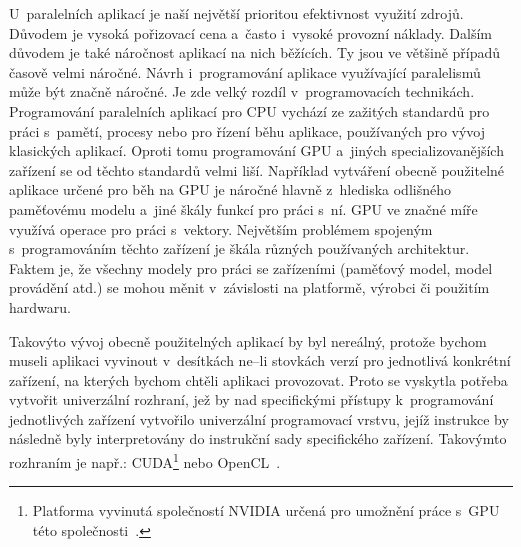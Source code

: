  U~paralelních aplikací je naší největší prioritou efektivnost využití zdrojů. Důvodem je
vysoká pořizovací cena a~často i~vysoké provozní náklady. Dalším důvodem je také náročnost aplikací
na nich běžících. Ty jsou ve většině případů časově velmi náročné. Návrh i~programování aplikace
využívající paralelismů může být značně náročné. Je zde velký rozdíl v~programovacích technikách.
Programování paralelních aplikací pro CPU vychází ze zažitých standardů pro práci s~pamětí,
procesy nebo pro řízení běhu aplikace, používaných pro vývoj klasických aplikací. Oproti tomu
programování GPU a~jiných specializovanějších zařízení se od těchto standardů velmi liší.
Například vytváření obecně použitelné aplikace určené pro běh na GPU je náročné hlavně z~hlediska
odlišného paměťovému modelu a~jiné škály funkcí pro práci s~ní. GPU ve značné míře využívá
operace pro práci s~vektory. Největším problémem spojeným s~programováním těchto zařízení je škála
různých používaných architektur. Faktem je, že všechny modely pro práci se zařízeními (paměťový
model, model provádění atd.) se mohou měnit v~závislosti na platformě, výrobci či použitím
hardwaru.

 Takovýto vývoj obecně použitelných aplikací by byl nereálný, protože bychom museli
aplikaci vyvinout v~desítkách ne--li stovkách verzí pro jednotlivá konkrétní zařízení, na kterých
bychom chtěli aplikaci provozovat. Proto se vyskytla potřeba vytvořit univerzální rozhraní, jež by
nad specifickými přístupy k~programování jednotlivých zařízení vytvořilo univerzální programovací
vrstvu, jejíž instrukce by následně byly interpretovány do instrukční sady specifického zařízení.
Takovýmto rozhraním je např.: CUDA\footnote{Platforma vyvinutá společností NVIDIA určená pro
umožnění práce s~GPU této společnosti~\cite{NVIDIA}.} nebo OpenCL~\cite{AMD:2011}.

